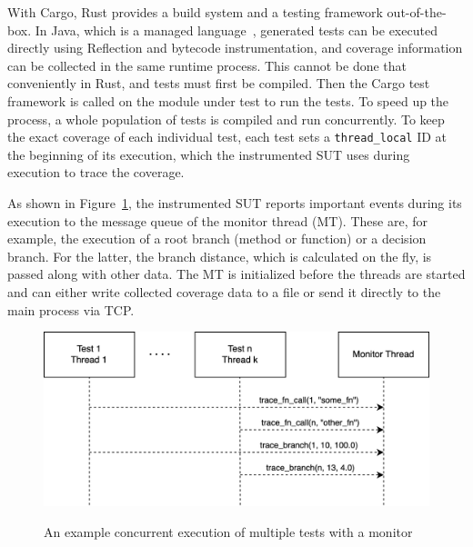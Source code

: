 \documentclass{article}
\begin{document}
With Cargo, Rust provides a build system and a testing framework out-of-the-box. In Java, which is a managed language~\cite{Gough2005}, generated tests can be executed directly using Reflection and bytecode instrumentation, and coverage information can be collected in the same runtime process. This cannot be done that conveniently in Rust, and tests must first be compiled. Then the Cargo test framework is called on the module under test to run the tests. To speed up the process, a whole population of tests is compiled and run concurrently. To keep the exact coverage of each individual test, each test sets a \lstinline{thread_local} ID at the beginning of its execution, which the instrumented \ac{SUT} uses during execution to trace the coverage. 


As shown in Figure~\ref{fig:test-execution}, the instrumented \ac{SUT} reports important events during its execution to the message queue of the monitor thread (MT). These are, for example, the execution of a root branch (method or function) or a decision branch. For the latter, the branch distance, which is calculated on the fly, is passed along with other data. The MT is initialized before the threads are started and can either write collected coverage data to a file or send it directly to the main process via TCP.

\begin{figure}[h]
\caption{An example concurrent execution of multiple tests with a monitor}
\centering
\includegraphics[width=\textwidth]{test-execution}
\label{fig:test-execution}
\end{figure}
\end{document}
